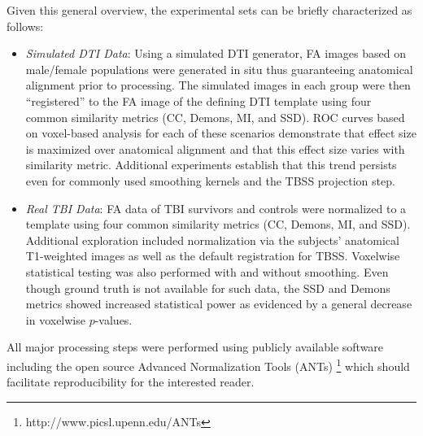 \documentclass[final,5p,times,twocolumn]{elsarticle}
\begin{document}
Given this general overview, the experimental sets can be briefly
characterized as follows:
\begin{itemize}
  \item {\it Simulated DTI Data}:  Using a simulated DTI generator,
  FA images based on male/female populations were generated in situ
  thus guaranteeing anatomical alignment prior to processing.
  The simulated images in each group were then ``registered'' to the FA image
  of the defining DTI 
  template using four common similarity metrics (CC, Demons, MI, and SSD).  
  ROC curves based on voxel-based analysis for each of these scenarios demonstrate that 
  effect size is maximized over anatomical alignment and that
  this effect size varies with similarity metric.  Additional
  experiments establish that this trend persists even for commonly used smoothing
  kernels and the TBSS projection step.
  \item {\it Real TBI Data}:  FA data of TBI survivors and controls were 
  normalized to a template using four common similarity metrics
  (CC, Demons, MI, and SSD).  Additional exploration included normalization via
  the subjects' anatomical T1-weighted images as well as the default registration for TBSS.
  Voxelwise statistical testing was also performed with
  and without smoothing.  Even though ground truth is not available for such
  data, the SSD and Demons metrics showed increased statistical power as evidenced
  by a general decrease in voxelwise $p$-values.
\end{itemize}
All major processing steps were performed using publicly available software including the open source Advanced Normalization Tools 
(ANTs)%
\footnote{
http://www.picsl.upenn.edu/ANTs
}
which should facilitate reproducibility for the interested 
reader.


\end{document}
